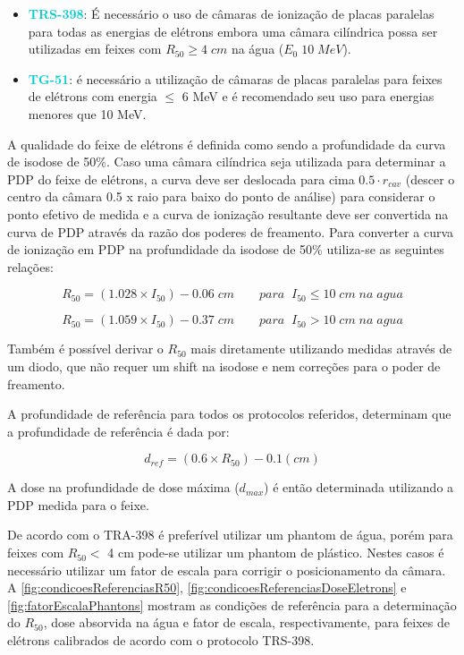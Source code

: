 \documentclass[11pt,a4paper]{article}
\begin{document}
		\begin{itemize}
			\item \textcolor{DarkTurquoise}{\Large\LobsterTwo\textbf{TRS-398}}: É necessário o uso de câmaras de ionização de placas paralelas para todas as energias de elétrons embora uma câmara cilíndrica possa ser utilizadas em feixes com $R_{50} \geq 4\;cm$ na água ($E_0 \; 10\; MeV$). 
			\item \textcolor{DarkTurquoise}{\Large\LobsterTwo\textbf{TG-51}}: é necessário a utilização de câmaras de placas paralelas para feixes de elétrons com energia $\leq$ 6 MeV e é recomendado seu uso para energias menores que 10 MeV.
		\end{itemize}

	A qualidade do feixe de elétrons é definida como sendo a profundidade da curva de isodose de 50\%. Caso uma câmara cilíndrica seja utilizada para determinar a PDP do feixe de elétrons, a curva deve ser deslocada para cima $0.5\cdot r_{cav}$ (descer o centro da câmara 0.5 x raio para baixo do ponto de análise) para considerar o ponto efetivo de medida e a curva de ionização resultante deve ser convertida na curva de PDP através da razão dos poderes de freamento. Para converter a curva de ionização em PDP na profundidade da isodose de 50\% utiliza-se as seguintes relações:

		$$R_{50} = (1.028 \times I_{50}) - 0.06 \; cm \qquad para\; \; I_{50} \leq 10 \; cm \; na \; agua$$

		$$R_{50} = (1.059 \times I_{50}) - 0.37\;cm \qquad para\; \; I_{50} > 10 \; cm\; na \; agua$$

	Também é possível derivar o $R_{50}$ mais diretamente utilizando medidas através de um diodo, que não requer um shift na isodose e nem correções para o poder de freamento. 

	A profundidade de referência para todos os protocolos referidos, determinam que a profundidade de referência é dada por:

		$$d_{ref} = (0.6 \times R_{50}) - 0.1 (cm) $$

	A dose na profundidade de dose máxima ($d_{max}$) é então determinada utilizando a PDP medida para o feixe.

	De acordo com o TRA-398 é preferível utilizar um phantom de água, porém para feixes com $R_{50} <$ 4 cm pode-se utilizar um phantom de plástico. Nestes casos é necessário utilizar um fator de escala para corrigir o posicionamento da câmara.  A \ref{fig:condicoesReferenciasR50}, \ref{fig:condicoesReferenciasDoseEletrons} e \ref{fig:fatorEscalaPhantons} mostram as condições de referência para a determinação do $R_{50}$, dose absorvida na água e fator de escala, respectivamente, para feixes de elétrons calibrados de acordo com o protocolo TRS-398.
	
\end{document}
